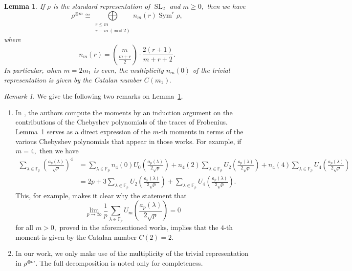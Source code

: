 \documentclass[12pt]{amsart}
\newtheorem{lemma}[theorem]{Lemma}
\theoremstyle{definition}
\theoremstyle{remark}
\newtheorem{remark}[theorem]{Remark}
\numberwithin{equation}{section}
\def \l {\lambda}
\def\F{{\mathbb F}}
\def \l {\lambda}
\def\F{\mathbb{F}}
\newcommand{\fp}
{\mathbb{F}_p}
\DeclareMathOperator{\SL}{SL}
\DeclareMathOperator{\Sym}{Sym}
\newcommand{\Mod}[1]{\ (\mathrm{mod}\ #1)}
\begin{document}
\begin{lemma}\label{oneRepMult}
    If $\rho$ is the standard representation of $\SL_2$ and $m\geq 0,$ then we have
    $$
    \rho^{\otimes m}\cong\bigoplus\limits_{\substack{r\leq m \\ r\equiv m\Mod{2}}} n_m(r)\Sym^r\rho, 
    $$
    where
    $$
    n_m(r) = \binom{m}{\frac{m+r}{2}}\cdot\frac{2(r+1)}{m+r+2}.
    $$
    In particular, when $m=2m_1$ is even, the multiplicity $n_m(0)$ of the trivial representation is given by the Catalan number $C(m_1).$
\end{lemma}

\begin{remark}
We give the following two remarks on Lemma~\ref{oneRepMult}.
\begin{enumerate}
\item In \cite{HGFDistributionOnoSaikia, ono2024distributionhessianvaluesgaussian,grove2024hypergeometricmomentshecketrace}, the authors compute the moments by an induction argument on the contributions of the Chebyshev polynomials of the traces of Frobenius. Lemma~\ref{oneRepMult} serves as a direct expression of the $m$-th moments in terms of the various Chebyshev polynomials that appear in those works. For example, if $m=4,$ then we have
\begin{align*}
    \sum\limits_{\lambda\in\F_p}\left(\frac{a_p(\lambda)}{\sqrt{p}}\right)^4 &=\sum\limits_{\lambda\in\F_p} n_4(0)U_0\left(\frac{a_p(\lambda)}{2\sqrt{p}}\right) + n_4(2) \sum_{\l \in \fp} U_2\left(\frac{a_p(\lambda)}{2\sqrt{p}}\right) + n_4(4) \sum_{\l \in \fp}U_4\left(\frac{a_p(\lambda)}{2\sqrt{p}}\right) \\ 
    &= 2p + 3\sum\limits_{\lambda\in\F_p}U_2\left(\frac{a_p(\lambda)}{2\sqrt{p}}\right) + \sum\limits_{\lambda\in\F_p}U_4\left(\frac{a_p(\lambda)}{2\sqrt{p}}\right).
    \end{align*}
This, for example, makes it clear why the statement that 
$$
\lim\limits_{p\to\infty}\frac{1}{p}\sum\limits_{\lambda\in\F_p} U_m\left(\frac{a_p(\lambda)}{2\sqrt{p}}\right) = 0
$$
for all $m>0,$ proved in the aforementioned works, implies that the $4$-th moment is given by the Catalan number $C(2)=2.$

\item In our work, we only make use of the multiplicity of the trivial representation in $\rho^{\otimes m}.$ The full decomposition is noted only for completeness.
\end{enumerate}
\end{remark}
\end{document}
